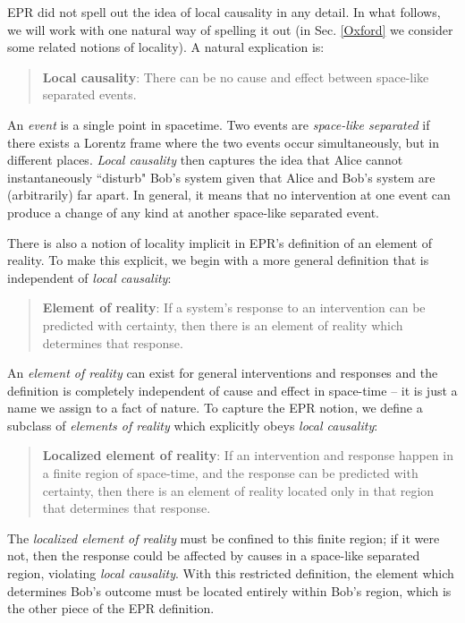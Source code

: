 \documentclass[a4paper]{article}
\begin{document}
EPR did not spell out the idea of local causality in any detail. In what follows, we will work with one natural way of spelling it out (in Sec. \ref{Oxford} we consider some related notions of locality). A natural explication is:

\begin{quote}
\textbf{Local causality}: There can be no cause and effect between space-like separated events.
\end{quote}

An \textit{event} is a single point in spacetime. Two events are \textit{space-like separated} if there exists a Lorentz frame where the two events occur simultaneously, but in different places. \textit{Local causality} then captures the idea that Alice cannot instantaneously ``disturb" Bob's system given that Alice and Bob's system are (arbitrarily) far apart.  In general, it means that no intervention at one event can produce a change of any kind at another space-like separated event.

There is also a notion of locality implicit in EPR's definition of an element of reality. To make this explicit, we begin with a more general definition that is independent of \textit{local causality}:

\begin{quote}
\textbf{Element of reality}: If a system's response to an intervention can be predicted with certainty, then there is an element of reality which determines that response.
\end{quote}

An \textit{element of reality} can exist for general interventions and responses and the definition is completely independent of cause and effect in space-time -- it is just a name we assign to a fact of nature.  To capture the EPR notion, we define a subclass of \textit{elements of reality} which explicitly obeys \textit{local causality}:

\begin{quote}
\textbf{Localized element of reality}: If an intervention and response happen in a finite region of space-time, and the response can be predicted with certainty, then there is an element of reality located only in that region that determines that response.
\end{quote}

The \textit{localized element of reality} must be confined to this finite region; if it were not, then the response could be affected by causes in a space-like separated region, violating \textit{local causality}. With this restricted definition, the element which determines Bob's outcome must be located entirely within Bob's region, which is the other piece of the EPR definition. 
\end{document}
